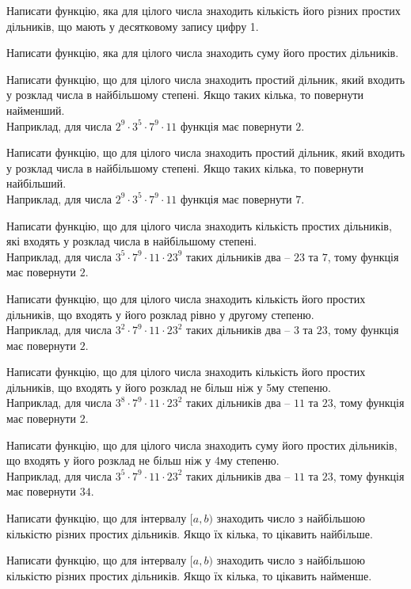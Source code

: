 \documentclass[12pt, ukrainian]{article}
\begin{document}
Написати функцію, яка для цілого числа знаходить кількість його різних простих дільників, що мають у десятковому запису цифру 1.


Написати функцію, яка для цілого числа знаходить суму його простих дільників.

Написати функцію, що для цілого числа знаходить простий дільник, який входить у розклад числа в найбільшому степені. Якщо таких кілька, то повернути найменший. \\ Наприклад, для числа $2^{9}{\cdot}3^5{\cdot}7^9{\cdot}11$ функція має повернути $2$.

Написати функцію, що для цілого числа знаходить простий дільник, який входить у розклад числа в найбільшому степені. Якщо таких кілька, то повернути найбільший. \\ Наприклад, для числа $2^{9}{\cdot}3^5{\cdot}7^9{\cdot}11$ функція має повернути $7$.

Написати функцію, що для цілого числа знаходить кількість простих дільників, які входять у розклад числа в найбільшому степені. \\ Наприклад, для числа $3^5{\cdot}7^9{\cdot}11{\cdot}23^{9}$ таких дільників два – $23$ та $7$, тому функція має повернути $2$.

Написати функцію, що для цілого числа знаходить кількість його простих дільників, що входять у його розклад рівно у другому степеню. \\ Наприклад, для числа $3^2{\cdot}7^9{\cdot}11{\cdot}23^{2}$ таких дільників два – $3$ та $23$, тому функція має повернути $2$.

Написати функцію, що для цілого числа знаходить кількість його простих дільників, що входять у його розклад не більш ніж у 5му степеню. \\ Наприклад, для числа $3^8{\cdot}7^9{\cdot}11{\cdot}23^{2}$ таких дільників два – $11$ та $23$, тому функція має повернути $2$.

Написати функцію, що для цілого числа знаходить суму його простих дільників, що входять у його розклад не більш ніж у 4му степеню. \\ Наприклад, для числа $3^5{\cdot}7^9{\cdot}11{\cdot}23^{2}$ таких дільників два – $11$ та $23$, тому функція має повернути $34$.

Написати функцію, що для інтервалу $[a, b)$ знаходить число з найбільшою кількістю різних простих дільників. Якщо їх кілька, то цікавить найбільше.

Написати функцію, що для інтервалу $[a, b)$ знаходить число з найбільшою кількістю різних простих дільників. Якщо їх кілька, то цікавить найменше.
\end{document}
